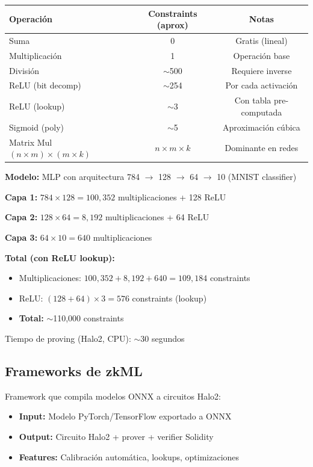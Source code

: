 \documentclass[11pt,a4paper,twoside]{book}
\begin{document}
\begin{center}
\begin{tabular}{lcc}
\toprule
\textbf{Operaci\'on} & \textbf{Constraints (aprox)} & \textbf{Notas} \\
\midrule
Suma & 0 & Gratis (lineal) \\
Multiplicaci\'on & 1 & Operaci\'on base \\
Divisi\'on & $\sim$500 & Requiere inverse \\
ReLU (bit decomp) & $\sim$254 & Por cada activaci\'on \\
ReLU (lookup) & $\sim$3 & Con tabla pre-computada \\
Sigmoid (poly) & $\sim$5 & Aproximaci\'on c\'ubica \\
Matrix Mul $(n \times m) \times (m \times k)$ & $n \times m \times k$ & Dominante en redes \\
\bottomrule
\end{tabular}
\end{center}

\begin{example}
\textbf{Modelo:} MLP con arquitectura 784 $\to$ 128 $\to$ 64 $\to$ 10 (MNIST classifier)

\textbf{Capa 1:} $784 \times 128 = 100,352$ multiplicaciones + 128 ReLU

\textbf{Capa 2:} $128 \times 64 = 8,192$ multiplicaciones + 64 ReLU

\textbf{Capa 3:} $64 \times 10 = 640$ multiplicaciones

\textbf{Total (con ReLU lookup):}
\begin{itemize}
    \item Multiplicaciones: $100,352 + 8,192 + 640 = 109,184$ constraints
    \item ReLU: $(128 + 64) \times 3 = 576$ constraints (lookup)
    \item \textbf{Total:} $\sim$110,000 constraints
\end{itemize}

Tiempo de proving (Halo2, CPU): $\sim$30 segundos
\end{example}

\subsection{Frameworks de zkML}

\begin{definition}[EZKL]
Framework que compila modelos ONNX a circuitos Halo2:
\begin{itemize}
    \item \textbf{Input:} Modelo PyTorch/TensorFlow exportado a ONNX
    \item \textbf{Output:} Circuito Halo2 + prover + verifier Solidity
    \item \textbf{Features:} Calibraci\'on autom\'atica, lookups, optimizaciones
\end{itemize}
\end{definition}
\end{document}
